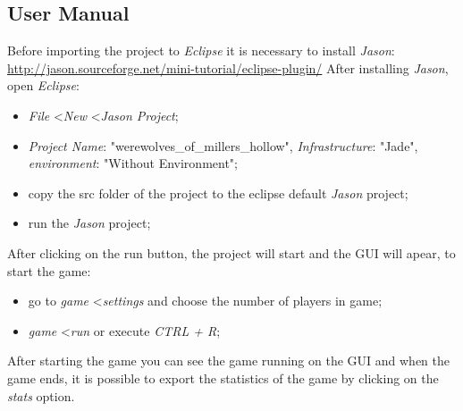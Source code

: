 \documentclass{article}
\begin{document}
\subsection{User Manual}
Before importing the project to \textit{Eclipse} it is necessary to install \textit{Jason}:
\newline
\url{http://jason.sourceforge.net/mini-tutorial/eclipse-plugin/} 
After installing \textit{Jason}, open \textit{Eclipse}:
\begin{itemize}
	\item \textit{File} \textless \textit{New} \textless \textit{Jason Project};
	\item \textit{Project Name}: "werewolves\_of\_millers\_hollow", \textit{Infrastructure}: "Jade", \textit{environment}: "Without Environment";
	\item copy the src folder of the project to the eclipse default \textit{Jason} project;
	\item run the \textit{Jason} project;
\end{itemize}

After clicking on the run button, the project will start and the GUI will apear, to start the game:
\begin{itemize}
	\item go to \textit{game} \textless \textit{settings} and choose the number of players in game;
	\item \textit{game} \textless \textit{run} or execute \textit{CTRL + R};
\end{itemize}
After starting the game you can see the game running on the GUI and when the game ends, it is possible to export the statistics of the game by clicking on the \textit{stats} option.
\end{document}

